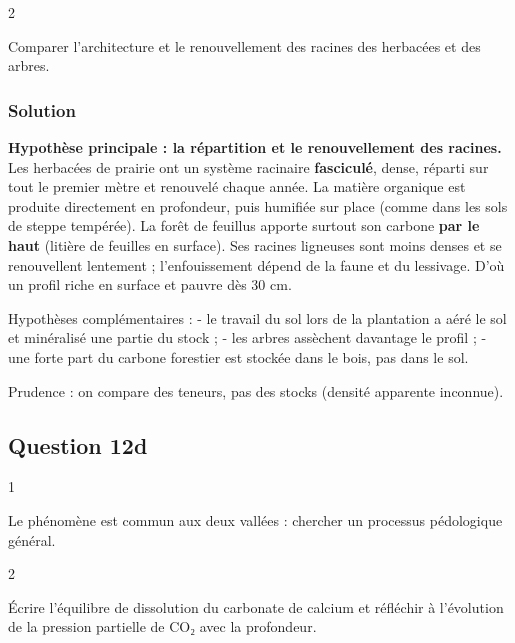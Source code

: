 \documentclass[11pt,a4paper]{article}
\begin{document}
\begin{indication}{2}

Comparer l'architecture et le renouvellement des racines des herbacées et des arbres.

\end{indication}

\hypertarget{solution-33}{%
\subsubsection{Solution}\label{solution-33}}

\textbf{Hypothèse principale : la répartition et le renouvellement des racines.} Les herbacées de prairie ont un système racinaire \textbf{fasciculé}, dense, réparti sur tout le premier mètre et renouvelé chaque année. La matière organique est produite directement en profondeur, puis humifiée sur place (comme dans les sols de steppe tempérée). La forêt de feuillus apporte surtout son carbone \textbf{par le haut} (litière de feuilles en surface). Ses racines ligneuses sont moins denses et se renouvellent lentement ; l'enfouissement dépend de la faune et du lessivage. D'où un profil riche en surface et pauvre dès 30 cm.

Hypothèses complémentaires :
- le travail du sol lors de la plantation a aéré le sol et minéralisé une partie du stock ;
- les arbres assèchent davantage le profil ;
- une forte part du carbone forestier est stockée dans le bois, pas dans le sol.

Prudence : on compare des teneurs, pas des stocks (densité apparente inconnue).

\hypertarget{question-12d}{%
\subsection{Question 12d}\label{question-12d}}

\begin{indication}{1}

Le phénomène est commun aux deux vallées : chercher un processus pédologique général.

\end{indication}

\begin{indication}{2}

Écrire l'équilibre de dissolution du carbonate de calcium et réfléchir à l'évolution de la pression partielle de CO₂ avec la profondeur.

\end{indication}
\end{document}
